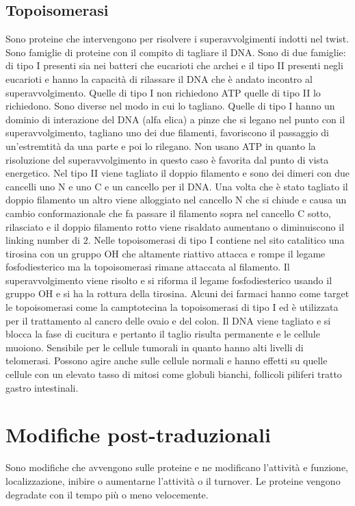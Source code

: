 \subsection{Topoisomerasi}
Sono proteine che intervengono per risolvere i superavvolgimenti indotti nel twist. Sono famiglie di proteine con il compito di tagliare il DNA. Sono di due famiglie: di tipo I presenti
sia nei batteri che eucarioti che archei e il tipo II presenti negli eucarioti e hanno la capacit\`a di rilassare il DNA che \`e andato incontro al superavvolgimento. Quelle di tipo I 
non richiedono ATP quelle di tipo II lo richiedono. Sono diverse nel modo in cui lo tagliano. Quelle di tipo I hanno un dominio di interazione del DNA (alfa elica) a pinze che si legano 
nel punto con il superavvolgimento, tagliano uno dei due filamenti, favoriscono il passaggio di un'estremtit\`a da una parte e poi lo rilegano. Non usano ATP in quanto la risoluzione 
del superavvolgimento in questo caso \`e favorita dal punto di vista energetico. Nel tipo II viene tagliato il doppio filamento e sono dei dimeri con due cancelli uno N e uno C e un 
cancello per il DNA. Una volta che \`e stato tagliato il doppio filamento un altro viene alloggiato nel cancello N che si chiude e causa un cambio conformazionale che fa passare il 
filamento sopra nel cancello C sotto, rilasciato e il doppio filamento rotto viene risaldato aumentano o diminuiscono il linking number di $2$. Nelle topoisomerasi di tipo I contiene nel
sito catalitico una tirosina con un gruppo OH che altamente riattivo attacca e rompe il legame fosfodiesterico ma la topoisomerasi rimane attaccata al filamento. Il superavvolgimento 
viene risolto e si riforma il legame fosfodiesterico usando il gruppo OH e si ha la rottura della tirosina. Alcuni dei farmaci hanno come target le topoisomerasi come la camptotecina 
la topoisomerasi di tipo I ed \`e utilizzata per il trattamento al cancro delle ovaio e del colon. Il DNA viene tagliato e si blocca la fase di cucitura e pertanto il taglio risulta 
permanente e le cellule muoiono. Sensibile per le cellule tumorali in quanto hanno alti livelli di telomerasi. Possono agire anche sulle cellule normali e hanno effetti su quelle cellule
con un elevato tasso di mitosi come globuli bianchi, follicoli piliferi tratto gastro intestinali. 
\section{Modifiche post-traduzionali}
Sono modifiche che avvengono sulle proteine e ne modificano l'attivit\`a e funzione, localizzazione, inibire o aumentarne l'attivit\`a o il turnover. Le proteine vengono degradate con il
tempo pi\`u o meno velocemente.
